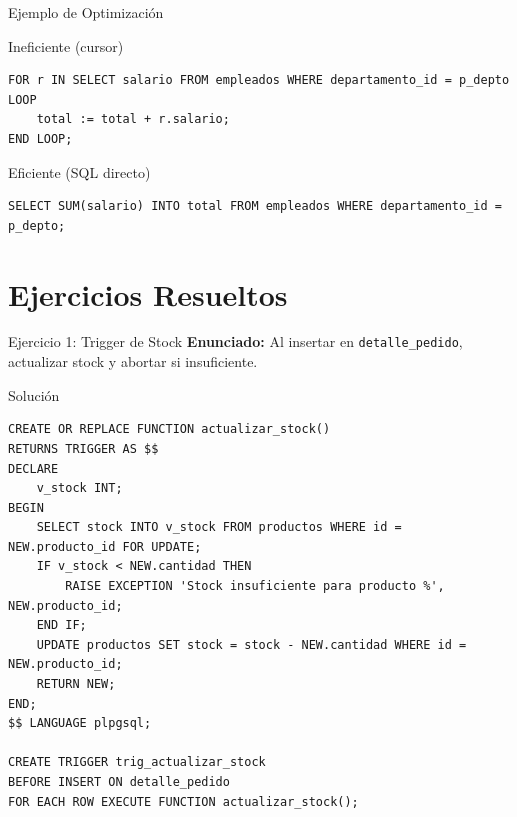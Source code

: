 \documentclass[aspectratio=169, 10pt, xcolor=table]{beamer}
\begin{document}
\begin{frame}[fragile]{Ejemplo de Optimización}
    \begin{block}{Ineficiente (cursor)}
        \begin{lstlisting}
FOR r IN SELECT salario FROM empleados WHERE departamento_id = p_depto LOOP
    total := total + r.salario;
END LOOP;
        \end{lstlisting}
    \end{block}
    \begin{block}{Eficiente (SQL directo)}
        \begin{lstlisting}
SELECT SUM(salario) INTO total FROM empleados WHERE departamento_id = p_depto;
        \end{lstlisting}
    \end{block}
\end{frame}

\section{Ejercicios Resueltos}

\begin{frame}[fragile]{Ejercicio 1: Trigger de Stock}
    \textbf{Enunciado:} Al insertar en \texttt{detalle\_pedido}, actualizar stock y abortar si insuficiente.
    \begin{block}{Solución}
        \begin{lstlisting}
CREATE OR REPLACE FUNCTION actualizar_stock()
RETURNS TRIGGER AS $$
DECLARE
    v_stock INT;
BEGIN
    SELECT stock INTO v_stock FROM productos WHERE id = NEW.producto_id FOR UPDATE;
    IF v_stock < NEW.cantidad THEN
        RAISE EXCEPTION 'Stock insuficiente para producto %', NEW.producto_id;
    END IF;
    UPDATE productos SET stock = stock - NEW.cantidad WHERE id = NEW.producto_id;
    RETURN NEW;
END;
$$ LANGUAGE plpgsql;

CREATE TRIGGER trig_actualizar_stock
BEFORE INSERT ON detalle_pedido
FOR EACH ROW EXECUTE FUNCTION actualizar_stock();
        \end{lstlisting}
    \end{block}
\end{frame}
\end{document}
